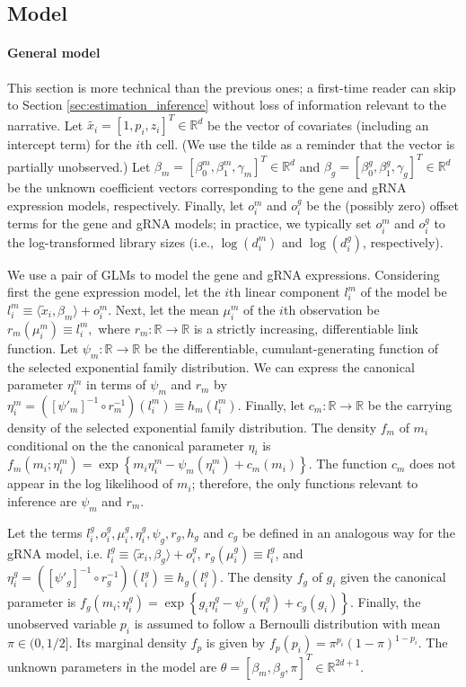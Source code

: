 \documentclass[12pt]{article}
\begin{document}
\subsection{Model}\label{sec:model}

\paragraph{General model} This section is more technical than the previous ones; a first-time reader can skip to Section \ref{sec:estimation_inference} without loss of information relevant to the narrative. Let $\tilde{x_i} = [1, p_i, z_i]^T \in \mathbb{R}^d$ be the vector of covariates (including an intercept term) for the $i$th cell. (We use the tilde as a reminder that the vector is partially unobserved.) Let $\beta_m = [\beta^m_0, \beta^m_1, \gamma_m]^T \in \mathbb{R}^d$ and $\beta_g = [\beta^g_0, \beta^g_1, \gamma_g]^T \in \mathbb{R}^d$ be the unknown coefficient vectors corresponding to the gene and gRNA expression models, respectively. Finally, let $o^m_i$ and $o^g_i$ be the (possibly zero) offset terms for the gene and gRNA models; in practice, we typically set $o^m_i$ and $o^g_i$ to the log-transformed library sizes (i.e., $\log(d^m_i)$ and $\log(d^g_i)$, respectively).

We use a pair of GLMs to model the gene and gRNA expressions. Considering first the gene expression model, let the $i$th linear component $l^m_i$ of the model be $l^m_i \equiv \langle \tilde{x}_i, \beta_m \rangle + o^m_i.$ Next, let the mean $\mu^m_i$ of the $i$th observation be $r_m(\mu^m_i) \equiv l^m_i,$ where $r_m:\mathbb{R} \to \mathbb{R}$ is a strictly increasing, differentiable link function. Let $\psi_m: \mathbb{R} \to \mathbb{R}$ be the differentiable, cumulant-generating function of the selected exponential family distribution. We can express the canonical parameter $\eta^m_i$ in terms of $\psi_m$ and $r_m$ by
$\eta^m_i = \left([\psi'_m]^{-1} \circ r^{-1}_m\right)(l_i^m) \equiv h_m(l_i^m).$ Finally, let $c_m: \mathbb{R} \to \mathbb{R}$ be the carrying density of the selected exponential family distribution. The density $f_m$ of $m_i$ conditional on the the canonical parameter $\eta_i$ is
$f_m(m_i; \eta^m_i) = \exp\left\{m_i \eta^m_i - \psi_m(\eta^m_i) + c_m(m_i) \right\}.$ The function $c_m$ does not appear in the log likelihood of $m_i$; therefore, the only functions relevant to inference are $\psi_m$ and $r_m$.

Let the terms $l^g_i, o^g_i, \mu^g_i, \eta^g_i, \psi_g, r_g, h_g$ and $c_g$ be defined in an analogous way for the gRNA model, i.e. $l^g_i \equiv \langle \tilde{x}_i, \beta_g \rangle + o^g_i$, $r_g(\mu^g_i) \equiv l^g_i$, and $\eta^g_i = \left([\psi'_g]^{-1} \circ r^{-1}_g\right)(l_i^g) \equiv h_g(l_i^g).$ The density $f_g$ of $g_i$ given the canonical parameter is $f_g(m_i; \eta^g_i) = \exp\left\{g_i \eta^g_i - \psi_g(\eta^g_i) + c_g(g_i)\right\}.$
Finally, the unobserved variable $p_i$ is assumed to follow a Bernoulli distribution with mean $\pi \in (0, 1/2]$. Its marginal density $f_p$ is given by $f_p(p_i) = \pi^{p_i}(1-\pi)^{1 - p_i}.$
The unknown parameters in the model are
$\theta = [\beta_m, \beta_g, \pi]^{T}  \in \mathbb{R}^{2d + 1}.$
\end{document}
